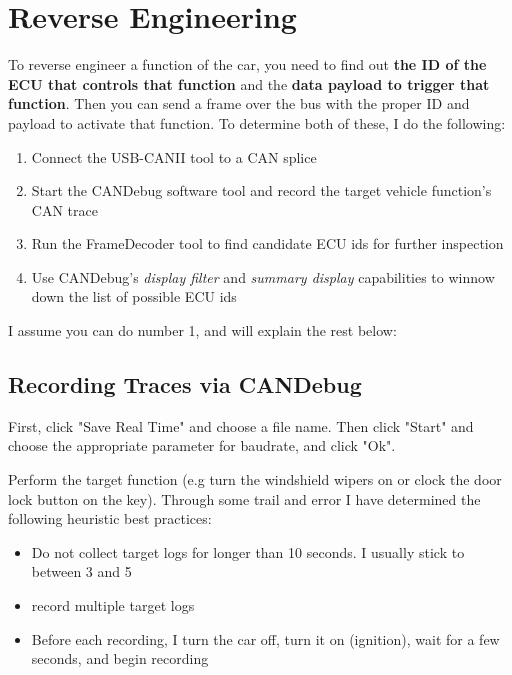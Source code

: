 \documentclass[12pt]{article}
\begin{document}
\section{Reverse Engineering}
To reverse engineer a function of the car, you need to find out \textbf{the ID of the
ECU that controls that function} and the \textbf{data payload to trigger that function}. 
Then you can send a frame over the bus with the proper ID and payload to
activate that function. To determine both of these, I do the following:
\begin{enumerate}
\item Connect the USB-CANII tool to a CAN splice
\item Start the CANDebug software tool and record the target vehicle function's
CAN trace
\item Run the FrameDecoder tool to find candidate ECU ids for further
inspection
\item Use CANDebug's \textit{display filter} and \textit{summary display}
capabilities to winnow down the list of possible ECU ids
\end{enumerate}

I assume you can do number 1, and will explain the rest below:
\subsection{Recording Traces via CANDebug}
First, click "Save Real Time" and choose a file name. Then click "Start" and 
choose the appropriate parameter for baudrate, and click "Ok".

Perform the target function (e.g turn the windshield wipers on or clock the
door lock button on the key). Through some trail and error I have determined
the following heuristic best practices:
\begin{itemize}
\item Do not collect target logs for longer than 10 seconds. I usually stick to
between 3 and 5
\item record multiple target logs
\item Before each recording, I turn the car off, turn it on (ignition), wait
for a few seconds, and begin recording
\end{itemize}
\end{document}
